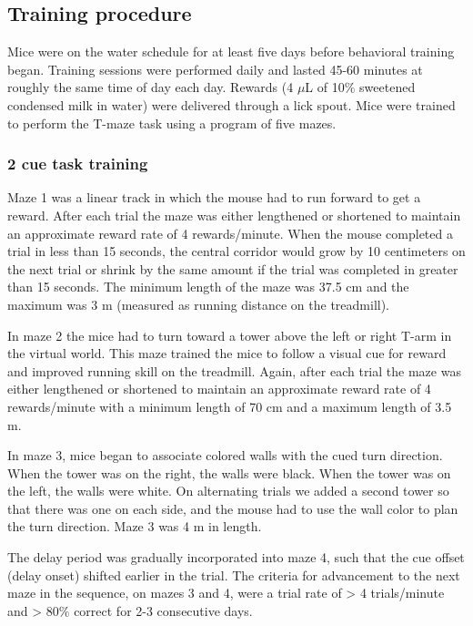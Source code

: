 \subsection{Training procedure} 
Mice were on the water schedule for at least five days before behavioral training began. Training sessions were performed daily and lasted 45-60 minutes at roughly the same time of day each day. Rewards (4 $\mu$L of 10$\%$ sweetened condensed milk in water) were delivered through a lick spout. Mice were trained to perform the T-maze task using a program of five mazes. 

\bigskip

\subsubsection{2 cue task training}
Maze 1 was a linear track in which the mouse had to run forward to get a reward.  After each trial the maze was either lengthened or shortened to maintain an approximate reward rate of 4 rewards/minute. When the mouse completed a trial in less than 15 seconds, the central corridor would grow by 10 centimeters on the next trial or shrink by the same amount if the trial was completed in greater than 15 seconds. The minimum length of the maze was 37.5 cm and the maximum was 3 m (measured as running distance on the treadmill). 

\bigskip

In maze 2 the mice had to turn toward a tower above the left or right T-arm in the virtual world. This maze trained the mice to follow a visual cue for reward and improved running skill on the treadmill. Again, after each trial the maze was either lengthened or shortened to maintain an approximate reward rate of 4 rewards/minute with a minimum length of 70 cm and a maximum length of 3.5 m. 

\bigskip

In maze 3, mice began to associate colored walls with the cued turn direction. When the tower was on the right, the walls were black. When the tower was on the left, the walls were white. On alternating trials we added a second tower so that there was one on each side, and the mouse had to use the wall color to plan the turn direction. Maze 3 was 4 m in length. 

\bigskip

The delay period was gradually incorporated into maze 4, such that the cue offset (delay onset) shifted earlier in the trial. The criteria for advancement to the next maze in the sequence, on mazes 3 and 4, were a trial rate of > 4 trials/minute and > 80$\%$ correct for 2-3 consecutive days. 

